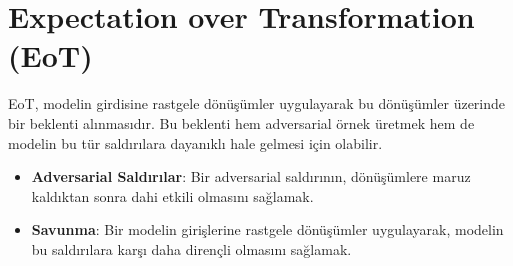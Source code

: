 \section{Expectation over Transformation (EoT)}

EoT, modelin girdisine rastgele dönüşümler uygulayarak bu dönüşümler üzerinde bir beklenti alınmasıdır. Bu beklenti hem adversarial örnek üretmek hem de modelin bu tür saldırılara dayanıklı hale gelmesi için olabilir.

\begin{itemize}
    \item \textbf{Adversarial Saldırılar}: Bir adversarial saldırının, dönüşümlere maruz kaldıktan sonra dahi etkili olmasını sağlamak.
    \item \textbf{Savunma}: Bir modelin girişlerine rastgele dönüşümler uygulayarak, modelin bu saldırılara karşı daha dirençli olmasını sağlamak.
\end{itemize}

\newpage